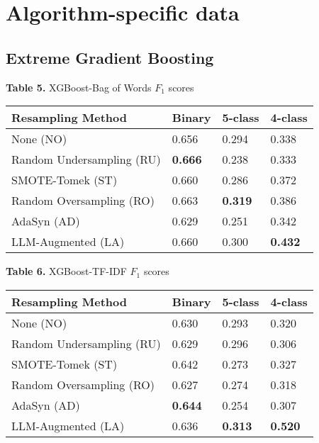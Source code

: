 \documentclass[runningheads]{llncs}
\newenvironment{nscenter}
 {\parskip=0pt\par\nopagebreak\centering}
 {\par\noindent\ignorespacesafterend}
\begin{document}
\appendix
\section{Algorithm-specific data}
\subsection{Extreme Gradient Boosting}
\begin{nscenter}
{\bf Table 5.} XGBoost-Bag of Words $F_1$ scores\\

\begin{tabular}{|l|l|l|l|}
\hline
Resampling Method & Binary & 5-class & 4-class \\\hline
None (NO) & 0.656 & 0.294  & 0.338 \\\hline
Random Undersampling (RU) & {\bf 0.666} & 0.238 & 0.333 \\\hline
SMOTE-Tomek (ST) & 0.660 & 0.286 & 0.372 \\\hline
Random Oversampling (RO) & 0.663 & {\bf 0.319} & 0.386 \\\hline
AdaSyn (AD) & 0.629 & 0.251 & 0.342 \\\hline
LLM-Augmented (LA) & 0.660 & 0.300 & {\bf 0.432} \\\hline
\end{tabular}
\end{nscenter}

\begin{nscenter}
{\bf Table 6.} XGBoost-TF-IDF $F_1$ scores\\

\begin{tabular}{|l|l|l|l|}
\hline
Resampling Method & Binary & 5-class & 4-class \\\hline
None (NO) & 0.630 & 0.293 & 0.320 \\\hline
Random Undersampling (RU) & 0.629 & 0.296 & 0.306 \\\hline
SMOTE-Tomek (ST) & 0.642 & 0.273 & 0.327 \\\hline
Random Oversampling (RO) & 0.627 & 0.274 & 0.318 \\\hline
AdaSyn (AD) & {\bf 0.644} & 0.254 & 0.307 \\\hline
LLM-Augmented (LA) & 0.636 & {\bf 0.313} & {\bf 0.520} \\\hline
\end{tabular}
\end{nscenter}
\end{document}
